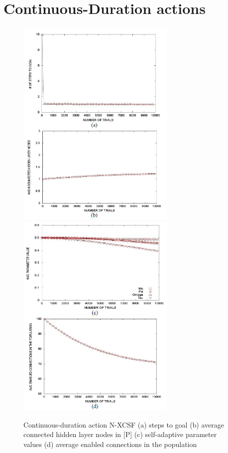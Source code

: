 \documentclass[12pt]{article}
\begin{document}
\section{Continuous-Duration actions}
\label{sec:verify}
\begin{figure}[!htbp]
\begin{center}
\includegraphics[width=3in]{5a.png}
\includegraphics[width=3in]{5b.png}
\end{center}
\caption{Continuous-duration action N-XCSF (a) steps to goal (b) average connected hidden layer nodes in [P] (c) self-adaptive parameter values (d) average enabled connections in the population \label{fig:first}}
\end{figure}
\end{document}
